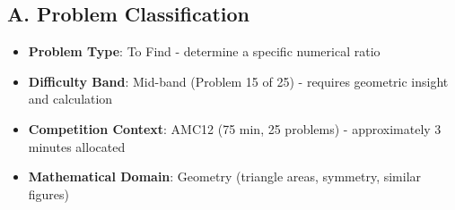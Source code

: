 \documentclass[11pt]{article}
\begin{document}
\begin{problemconfigbox}
\subsection*{A. Problem Classification}
\begin{itemize}[leftmargin=*]
    \item \textbf{Problem Type}: To Find - determine a specific numerical ratio
    \item \textbf{Difficulty Band}: Mid-band (Problem 15 of 25) - requires geometric insight and calculation
    \item \textbf{Competition Context}: AMC12 (75 min, 25 problems) - approximately 3 minutes allocated
    \item \textbf{Mathematical Domain}: Geometry (triangle areas, symmetry, similar figures)
\end{itemize}


\end{problemconfigbox}
\end{document}
